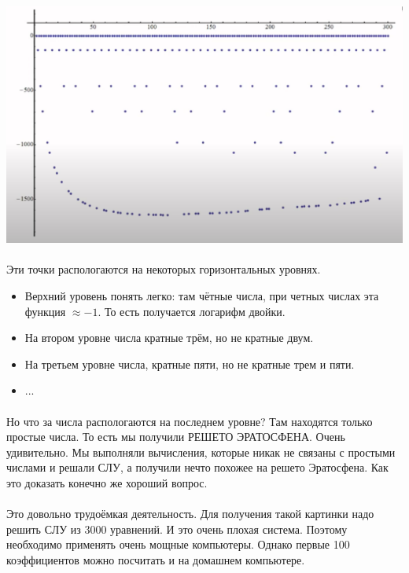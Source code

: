 \documentclass{article}
\begin{document}
\includegraphics{./images/log.png}

\paragraph{}
Эти точки распологаются на некоторых горизонтальных уровнях.

\begin{itemize}
    \item Верхний уровень понять легко: там чётные числа, при четных числах эта функция $\approx -1$.
    То есть получается логарифм двойки.
    \item На втором уровне числа кратные трём, но не кратные двум.
    \item На третьем уровне числа, кратные пяти, но не кратные трем и пяти.
    \item ...
\end{itemize}

\paragraph{}
Но что за числа распологаются на последнем уровне? Там находятся только простые числа.
То есть мы получили РЕШЕТО ЭРАТОСФЕНА. Очень удивительно. Мы выполняли вычисления, которые никак не связаны с простыми числами и решали
СЛУ, а получили нечто похожее на решето Эратосфена. Как это доказать конечно же хороший вопрос.

\paragraph{}
Это довольно трудоёмкая деятельность. Для получения такой картинки надо решить
СЛУ из 3000 уравнений. И это очень плохая система.
Поэтому необходимо применять очень мощные компьютеры.
Однако первые 100 коэффициентов можно посчитать и на домашнем компьютере.
\end{document}
